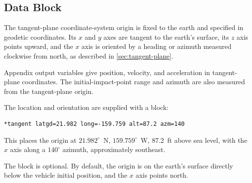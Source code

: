 \subsection{ Data Block}\label{sec:block-tangent}

The tangent-plane coordinate-system origin is fixed to the earth and specified in
geodetic coordinates. Its $x$ and $y$ axes are tangent to the earth's surface, its $z$
axis points upward, and the $x$ axis is oriented by a heading or azimuth measured
clockwise from north, as described in \cref{sec:tangent-plane}.

Appendix output variables give position, velocity, and acceleration in tangent-plane
coordinates. The initial-impact-point range and azimuth are also measured from the
tangent-plane origin.

The location and orientation are supplied with a  block:

\begin{lstlisting}[style=taosmanual]
*tangent latgd=21.982 long=-159.759 alt=87.2 azm=140
\end{lstlisting}

This places the origin at $21.982^\circ$~N, $159.759^\circ$~W, 87.2~ft above sea
level, with the $x$ axis along a $140^\circ$ azimuth, approximately southeast.

The block is optional. By default, the origin is on the earth's surface directly below
the vehicle initial position, and the $x$ axis points north.
